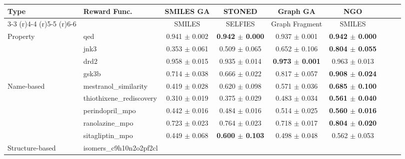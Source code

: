 \begin{tabular}{llccccccc}
    \toprule
    \multirow{4}{*}{Type} & \multirow{4}{*}{Reward Func.} & SMILES GA & STONED & Graph GA & NGO \\
    \cmidrule(r){3-3} \cmidrule(r){4-4} \cmidrule(r){5-5} \cmidrule(r){6-6}
     & & SMILES & SELFIES & Graph Fragment & SMILES \\
    \midrule
    \multirow{4}{*}{Property} & qed 
    & 0.941 \footnotesize{$\pm$ 0.002} 
    & \textbf{0.942 \footnotesize{$\pm$ 0.000}} 
    & 0.937 \footnotesize{$\pm$ 0.001} 
    & \textbf{0.942 \footnotesize{$\pm$ 0.000}} \\
     & jnk3 
    & 0.353 \footnotesize{$\pm$ 0.061} 
    & 0.509 \footnotesize{$\pm$ 0.065} 
    & 0.652 \footnotesize{$\pm$ 0.106} 
    & \textbf{0.804 \footnotesize{$\pm$ 0.055}} \\
     & drd2 
    & 0.958 \footnotesize{$\pm$ 0.015} 
    & 0.935 \footnotesize{$\pm$ 0.014} 
    & \textbf{0.973 \footnotesize{$\pm$ 0.001}} 
    & 0.963 \footnotesize{$\pm$ 0.013} \\
     & gsk3b 
    & 0.714 \footnotesize{$\pm$ 0.038} 
    & 0.666 \footnotesize{$\pm$ 0.022} 
    & 0.817 \footnotesize{$\pm$ 0.057} 
    & \textbf{0.908 \footnotesize{$\pm$ 0.024}} \\
    \midrule
    \multirow{5}{*}{Name-based} & mestranol\_similarity 
    & 0.419 \footnotesize{$\pm$ 0.028} 
    & 0.620 \footnotesize{$\pm$ 0.098} 
    & 0.571 \footnotesize{$\pm$ 0.036} 
    & \textbf{0.685 \footnotesize{$\pm$ 0.100}} \\
     & thiothixene\_rediscovery 
    & 0.310 \footnotesize{$\pm$ 0.019} 
    & 0.375 \footnotesize{$\pm$ 0.029} 
    & 0.483 \footnotesize{$\pm$ 0.034} 
    & \textbf{0.561 \footnotesize{$\pm$ 0.040}} \\
     & perindopril\_mpo 
    & 0.442 \footnotesize{$\pm$ 0.016} 
    & 0.484 \footnotesize{$\pm$ 0.016} 
    & 0.514 \footnotesize{$\pm$ 0.025} 
    & \textbf{0.560 \footnotesize{$\pm$ 0.016}} \\
     & ranolazine\_mpo 
    & 0.723 \footnotesize{$\pm$ 0.023} 
    & 0.764 \footnotesize{$\pm$ 0.023} 
    & 0.718 \footnotesize{$\pm$ 0.017} 
    & \textbf{0.804 \footnotesize{$\pm$ 0.020}} \\
     & sitagliptin\_mpo 
    & 0.449 \footnotesize{$\pm$ 0.068} 
    & \textbf{0.600 \footnotesize{$\pm$ 0.103}} 
    & 0.498 \footnotesize{$\pm$ 0.048} 
    & 0.562 \footnotesize{$\pm$ 0.053} \\
    \midrule
    \multirow{3}{*}{Structure-based} & isomers\_c9h10n2o2pf2cl 

\end{tabular}
